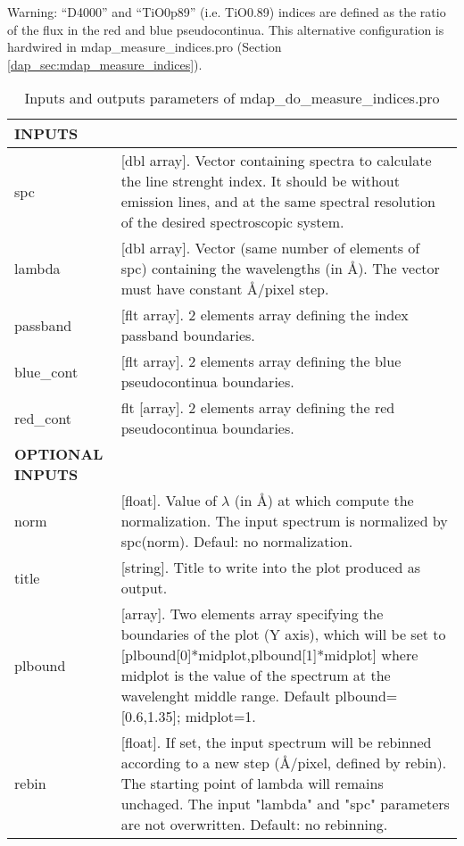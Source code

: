 Warning: ``D4000'' and ``TiO0p89'' (i.e. TiO0.89) indices are defined
as the ratio of the flux in the red and blue pseudocontinua. This
alternative configuration is hardwired in mdap\_measure\_indices.pro
(Section \ref{dap_sec:mdap_measure_indices}).

\begin{center}
\begin{longtable}{p{2.7cm}| p{11.1cm}}
\caption{Inputs and outputs parameters of mdap\_do\_measure\_indices.pro} \label{dap_tab:mdap_do_measure_indices} \\
\hline
\endfirsthead
\hline
\endhead
\hline
\endlastfoot
\hline
{\bf  INPUTS} & \\
\hline
%
spc    &  [dbl array].  Vector containing  spectra to calculate the line strenght index. It should be without emission lines, and at the same 
                         spectral resolution of the desired spectroscopic system.\\
%
lambda &  [dbl array].  Vector (same number of elements of spc) containing the wavelengths (in \AA). The vector must have constant \AA/pixel step.\\
%
passband & [flt array].    2 elements array defining the index passband boundaries.\\
%
blue\_cont &[flt array].    2 elements array defining the blue pseudocontinua boundaries.\\
%
red\_cont  &flt [array].    2 elements array defining the red pseudocontinua boundaries.\\
\hline 
{\bf OPTIONAL INPUTS} & \\
\hline
norm    &  [float].    Value of $\lambda$ (in \AA) at which compute the normalization. The input spectrum is normalized by spc(norm). Defaul: no normalization.\\
%
title   &  [string].   Title to write into the plot produced as output. \\
%
plbound &  [array].    Two elements array specifying the boundaries of
                     the plot (Y axis), which will be set to [plbound[0]*midplot,plbound[1]*midplot]
                     where midplot is the value of the spectrum at
                     the wavelenght middle range. Default plbound=[0.6,1.35]; midplot=1.\\
%
rebin   &  [float].  If set, the input spectrum will be rebinned according to a new step (\AA/pixel, defined by
                     rebin). The starting point of lambda will remains  unchaged. The input "lambda" and "spc" parameters are not overwritten.
                     Default: no rebinning.\\

\end{longtable}
\end{center}

